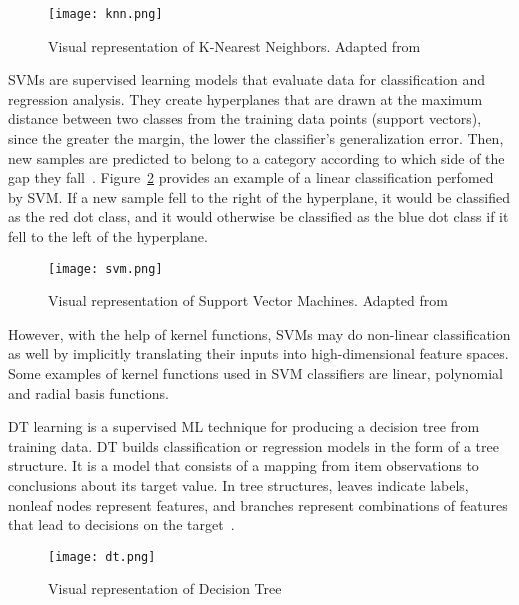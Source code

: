 \begin{figure}[htbp]
    \centering
    \texttt{[image: knn.png]}
    \caption{Visual representation of K-Nearest Neighbors. Adapted from~\cite{Bronshtein2017AMedium}}
    \label{fig:knn}
\end{figure}

\gls{SVM}s are supervised learning models that evaluate data for classification and regression analysis. They create hyperplanes that are drawn at the maximum distance between two classes from the training data points (support vectors), since the greater the margin, the lower the classifier's generalization error. Then, new samples are predicted to belong to a category according to which side of the gap they fall~\cite{Mahesh2019MachineReview}. Figure~\ref{fig:svm} provides an example of a linear classification perfomed by \gls{SVM}. If a new sample fell to the right of the hyperplane, it would be classified as the red dot class, and it would otherwise be classified as the blue dot class if it fell to the left of the hyperplane. 

\begin{figure}[htbp]
    \centering
    \texttt{[image: svm.png]}
    \caption{Visual representation of Support Vector Machines. Adapted from~\cite{MaquinaExplicada}}
    \label{fig:svm}
\end{figure}

However, with the help of kernel functions, \gls{SVM}s may do non-linear classification as well by implicitly translating their inputs into high-dimensional feature spaces. Some examples of kernel functions used in \gls{SVM} classifiers are linear, polynomial and radial basis functions.

\gls{DT} learning is a supervised \gls{ML} technique for producing a decision tree from training data. \gls{DT} builds classification or regression models in the form of a tree structure. It is a model that consists of a mapping from item observations to conclusions about its target value. In tree structures, leaves indicate labels, nonleaf nodes represent features, and branches represent combinations of features that lead to decisions on the target~\cite{Tan2015CodeQuality}.

\begin{figure}[htbp]
    \centering
    \texttt{[image: dt.png]}
    \caption{Visual representation of Decision Tree}
    \label{fig:dt}
\end{figure}

